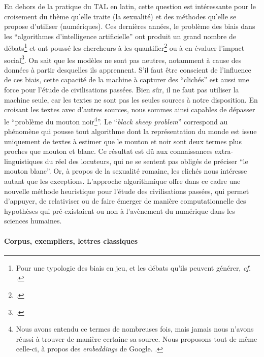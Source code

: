 En dehors de la pratique du TAL en latin, cette question est intéressante pour le croisement du thème qu'elle traite (la sexualité) et des méthodes qu'elle se propose d'utiliser (numériques). Ces dernières années, le problème des biais dans les \enquote{algorithmes d'intelligence artificielle} ont produit un grand nombre de débats\footnote{Pour une typologie des biais en jeu, et les débats qu'ils peuvent générer, \textit{cf.} \textcite{}.} et ont poussé les chercheurs à les quantifier\footcite{bolukbasi2016quantifying} ou à en évaluer l'impact social\footcite{doi:10.1126/science.aal4230}. On sait que les modèles ne sont pas neutres, notamment à cause des données à partir desquelles ils apprennent. S'il faut être conscient de l'influence de ces biais, cette capacité de la machine à capturer des \enquote{clichés} est aussi une force pour l'étude de civilisations passées. Bien sûr, il ne faut pas utiliser la machine seule, car les textes ne sont pas les seules sources à notre disposition. En croisant les textes avec d'autres sources, nous sommes ainsi capables de dépasser le \enquote{problème du mouton noir\footnote{Nous avons entendu ce termes de nombreuses fois, mais jamais nous n'avons réussi à trouver de manière certaine sa source. Nous proposons tout de même celle-ci, à propos des \textit{embeddings} de Google. \textcite{daume_blacksheep_2016}.}}. Le \enquote{\textit{black sheep problem}} correspond au phénomène qui pousse tout algorithme dont la représentation du monde est issue uniquement de textes à estimer que le mouton et noir sont deux termes plus proches que mouton et blanc. Ce résultat est dû aux connaissances extra-linguistiques du réel des locuteurs, qui ne se sentent pas obligés de préciser \enquote{le mouton blanc}. Or, à propos de la sexualité romaine, les clichés nous intéresse autant que les exceptions. L'approche algorithmique offre dans ce cadre une nouvelle méthode heuristique pour l'étude des civilisations passées, qui permet d'appuyer, de relativiser ou de faire émerger de manière computationnelle des hypothèses qui pré-existaient ou non à l'avènement du numérique dans les sciences humaines.

\paragraph{Corpus, exempliers, lettres classiques}

